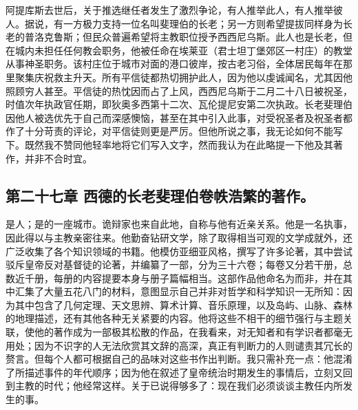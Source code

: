 阿提库斯去世后，关于推选继任者发生了激烈争论，有人推举此人，有人推举彼人。据说，有一方极力支持一位名叫斐理伯的长老；另一方则希望提拔同样身为长老的普洛克鲁斯；但民众普遍希望将主教职位授予西西尼乌斯。此人也是长老，但在城内未担任任何教会职务，他被任命在埃莱亚（君士坦丁堡郊区一村庄）的教堂从事神圣职务。该村庄位于城市对面的港口彼岸，按古老习俗，全体居民每年在那里聚集庆祝救主升天。所有平信徒都热切拥护此人，因为他以虔诚闻名，尤其因他照顾穷人甚至。平信徒的热忱因而占了上风，西西尼乌斯于二月二十八日被祝圣，时值次年执政官任期，即狄奥多西第十二次、瓦伦提尼安第二次执政。长老斐理伯因他人被选优先于自己而深感懊恼，甚至在其中引入此事，对受祝圣者及祝圣者都作了十分苛责的评论，对平信徒则更是严厉。但他所说之事，我无论如何不能写下。既然我不赞同他轻率地将它们写入文字，然而我认为在此略提一下他及其著作，并非不合时宜。\newline{}\par


\subsection{第二十七章 西德的长老斐理伯卷帙浩繁的著作。}

是人；是的一座城市。诡辩家也来自此地，自称与他有近亲关系。他是一名执事，因此得以与主教亲密往来。他勤奋钻研文学，除了取得相当可观的文学成就外，还广泛收集了各个知识领域的书籍。他模仿亚细亚风格，撰写了许多论著，其中尝试驳斥皇帝反对基督徒的论著，并编纂了一部，分为三十六卷；每卷又分若干册，总数近千册，每册的内容提要本身与册子篇幅相当。这部作品他命名为而非，并在其中汇集了大量五花八门的材料，意图显示自己并非对哲学和科学知识一无所知：因为其中包含了几何定理、天文思辨、算术计算、音乐原理，以及岛屿、山脉、森林的地理描述，还有其他各种无关紧要的内容。他将这些不相干的细节强行与主题关联，使他的著作成为一部极其松散的作品，在我看来，对无知者和有学识者都毫无用处；因为不识字的人无法欣赏其文辞的高深，真正有判断力的人则谴责其冗长的赘言。但每个人都可根据自己的品味对这些书作出判断。我只需补充一点：他混淆了所描述事件的年代顺序；因为他在叙述了皇帝统治时期发生的事情后，立刻又回到主教的时代；他经常这样。关于已说得够多了：现在我们必须谈谈主教任内所发生的事。\par


